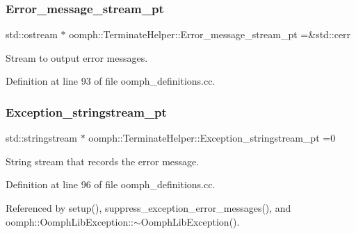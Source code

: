 \subsubsection{\texorpdfstring{Error\+\_\+message\+\_\+stream\+\_\+pt}{Error\_message\_stream\_pt}}
{\footnotesize\ttfamily std\+::ostream $\ast$ oomph\+::\+Terminate\+Helper\+::\+Error\+\_\+message\+\_\+stream\+\_\+pt =\&std\+::cerr}



Stream to output error messages. 



Definition at line 93 of file oomph\+\_\+definitions.\+cc.

\mbox{\label{namespaceoomph_1_1TerminateHelper_ad77707e2dee91388903b687945b908ff}} 
\subsubsection{\texorpdfstring{Exception\+\_\+stringstream\+\_\+pt}{Exception\_stringstream\_pt}}
{\footnotesize\ttfamily std\+::stringstream $\ast$ oomph\+::\+Terminate\+Helper\+::\+Exception\+\_\+stringstream\+\_\+pt =0}



String stream that records the error message. 



Definition at line 96 of file oomph\+\_\+definitions.\+cc.



Referenced by setup(), suppress\+\_\+exception\+\_\+error\+\_\+messages(), and oomph\+::\+Oomph\+Lib\+Exception\+::$\sim$\+Oomph\+Lib\+Exception().

